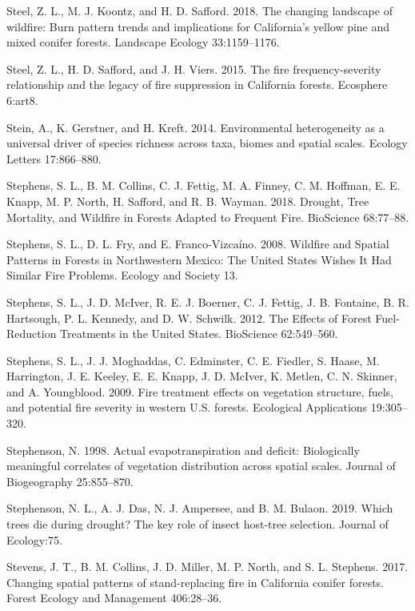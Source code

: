 \documentclass[twoside,12pt,final]{ucthesis-CA2012}
\begin{document}
\begin{ucmainmatter}
\hypertarget{ref-steel2018}{}
Steel, Z. L., M. J. Koontz, and H. D. Safford. 2018. The changing
landscape of wildfire: Burn pattern trends and implications for
California's yellow pine and mixed conifer forests. Landscape Ecology
33:1159--1176.

\hypertarget{ref-steel2015}{}
Steel, Z. L., H. D. Safford, and J. H. Viers. 2015. The fire
frequency-severity relationship and the legacy of fire suppression in
California forests. Ecosphere 6:art8.

\hypertarget{ref-stein2014}{}
Stein, A., K. Gerstner, and H. Kreft. 2014. Environmental heterogeneity
as a universal driver of species richness across taxa, biomes and
spatial scales. Ecology Letters 17:866--880.

\hypertarget{ref-stephens2018}{}
Stephens, S. L., B. M. Collins, C. J. Fettig, M. A. Finney, C. M.
Hoffman, E. E. Knapp, M. P. North, H. Safford, and R. B. Wayman. 2018.
Drought, Tree Mortality, and Wildfire in Forests Adapted to Frequent
Fire. BioScience 68:77--88.

\hypertarget{ref-stephens2008}{}
Stephens, S. L., D. L. Fry, and E. Franco-Vizcaíno. 2008. Wildfire and
Spatial Patterns in Forests in Northwestern Mexico: The United States
Wishes It Had Similar Fire Problems. Ecology and Society 13.

\hypertarget{ref-stephens2012a}{}
Stephens, S. L., J. D. McIver, R. E. J. Boerner, C. J. Fettig, J. B.
Fontaine, B. R. Hartsough, P. L. Kennedy, and D. W. Schwilk. 2012. The
Effects of Forest Fuel-Reduction Treatments in the United States.
BioScience 62:549--560.

\hypertarget{ref-stephens2009}{}
Stephens, S. L., J. J. Moghaddas, C. Edminster, C. E. Fiedler, S. Haase,
M. Harrington, J. E. Keeley, E. E. Knapp, J. D. McIver, K. Metlen, C. N.
Skinner, and A. Youngblood. 2009. Fire treatment effects on vegetation
structure, fuels, and potential fire severity in western U.S. forests.
Ecological Applications 19:305--320.

\hypertarget{ref-stephenson1998}{}
Stephenson, N. 1998. Actual evapotranspiration and deficit: Biologically
meaningful correlates of vegetation distribution across spatial scales.
Journal of Biogeography 25:855--870.

\hypertarget{ref-stephenson2019}{}
Stephenson, N. L., A. J. Das, N. J. Ampersee, and B. M. Bulaon. 2019.
Which trees die during drought? The key role of insect host-tree
selection. Journal of Ecology:75.

\hypertarget{ref-stevens2017}{}
Stevens, J. T., B. M. Collins, J. D. Miller, M. P. North, and S. L.
Stephens. 2017. Changing spatial patterns of stand-replacing fire in
California conifer forests. Forest Ecology and Management 406:28--36.


\end{ucmainmatter}
\end{document}
